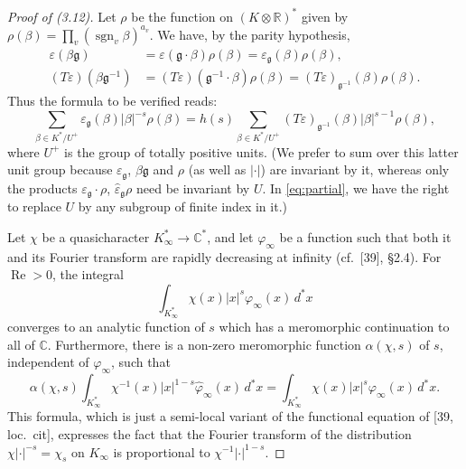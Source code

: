 \documentclass[12pt,a4paper]{article}
\theoremstyle{plain}
\theoremstyle{definition}
\DeclareMathOperator{\sgn}{sgn}
\DeclareMathOperator{\Res}{Re}
\newcommand{\R}{\mathbb{R}}
\newcommand{\C}{\mathbb{C}}
\begin{document}
\begin{proof}[Proof of (3.12)]
Let $\rho$ be the function on $(K\otimes\R)^*$ given by $\rho(\beta)=\prod_v(\sgn_v\beta)^{a_v}$. We have, by the parity hypothesis,
\begin{align}
\varepsilon(\beta\mathfrak{g})&=\varepsilon(\mathfrak{g}\cdot\beta)\rho(\beta)=\varepsilon_{\mathfrak{g}}(\beta)\rho(\beta),\label{eq:eps-rho}\\
(T\varepsilon)(\beta\mathfrak{g}^{-1})&=(T\varepsilon)(\mathfrak{g}^{-1}\cdot\beta)\rho(\beta)=(T\varepsilon)_{\mathfrak{g}^{-1}}(\beta)\rho(\beta).\label{eq:Te-rho}
\end{align}
Thus the formula to be verified reads:
\begin{equation}\label{eq:verify}
\sum_{\beta\in K^*/U^+}\varepsilon_{\mathfrak{g}}(\beta)|\beta|^{-s}\rho(\beta)=h(s)\sum_{\beta\in K^*/U^+}(T\varepsilon)_{\mathfrak{g}^{-1}}(\beta)|\beta|^{s-1}\rho(\beta),
\end{equation}
where $U^+$ is the group of totally positive units. (We prefer to sum over this latter unit group because $\varepsilon_{\mathfrak{g}}$, $\beta\mathfrak{g}$ and $\rho$ (as well as $|\cdot|$) are invariant by it, whereas only the products $\varepsilon_{\mathfrak{g}}\cdot\rho$, $\hat{\varepsilon}_{\mathfrak{g}}\rho$ need be invariant by $U$. In \eqref{eq:partial}, we have the right to replace $U$ by any subgroup of finite index in it.)

Let $\chi$ be a quasicharacter $K_{\infty}^*\to\C^*$, and let $\varphi_{\infty}$ be a function such that both it and its Fourier transform are rapidly decreasing at infinity (cf.~[39], \S2.4). For $\Res>0$, the integral
\begin{equation}\label{eq:integral}
\int_{K_{\infty}^*}\chi(x)|x|^s\varphi_{\infty}(x)\,d^*x
\end{equation}
converges to an analytic function of $s$ which has a meromorphic continuation to all of $\C$. Furthermore, there is a non-zero meromorphic function $\alpha(\chi,s)$ of $s$, independent of $\varphi_{\infty}$, such that
\begin{equation}\label{eq:fe-local}
\alpha(\chi,s)\int_{K_{\infty}^*}\chi^{-1}(x)|x|^{1-s}\hat{\varphi}_{\infty}(x)\,d^*x=\int_{K_{\infty}^*}\chi(x)|x|^s\varphi_{\infty}(x)\,d^*x.
\end{equation}
This formula, which is just a semi-local variant of the functional equation of [39, loc.~cit], expresses the fact that the Fourier transform of the distribution $\chi|\cdot|^{-s}=\chi_s$ on $K_{\infty}$ is proportional to $\chi^{-1}|\cdot|^{1-s}$.


\end{proof}
\end{document}
